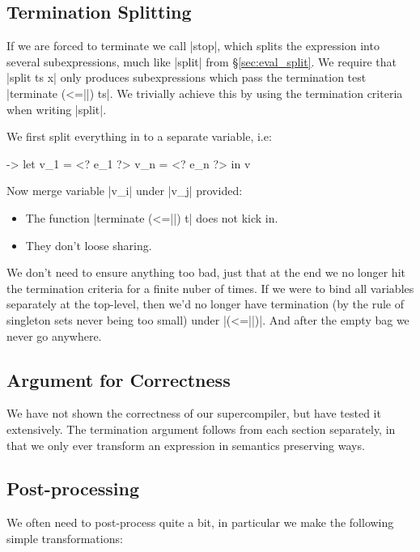 \documentclass[draft]{sigplanconf}
\begin{document}
\subsection{Termination Splitting}
\label{sec:term_split}

If we are forced to terminate we call |stop|, which splits the expression into several subexpressions, much like |split| from \S\ref{sec:eval_split}. We require that |split ts x| only produces subexpressions which pass the termination test |terminate (<=||) ts|. We trivially achieve this by using the termination criteria when writing |split|.

We first split everything in to a separate variable, i.e:

\begin{code}
\free ->  let  v_1 = <? e_1 ?>
               v_n = <? e_n ?>
          in   v
\end{code}

Now merge variable |v_i| under |v_j| provided:

\begin{itemize}
\item The function |terminate (<=||) t| does not kick in.
\item They don't loose sharing.
\end{itemize}

We don't need to ensure anything too bad, just that at the end we no longer hit the termination criteria for a finite nuber of times. If we were to bind all variables separately at the top-level, then we'd no longer have termination (by the rule of singleton sets never being too small) under |(<=||)|. And after the empty bag we never go anywhere.

\subsection{Argument for Correctness}

We have not shown the correctness of our supercompiler, but have tested it extensively. The termination argument follows from each section separately, in that we only ever transform an expression in semantics preserving ways.

\subsection{Post-processing}
\label{sec:postprocess}

We often need to post-process quite a bit, in particular we make the following simple transformations:
\end{document}
